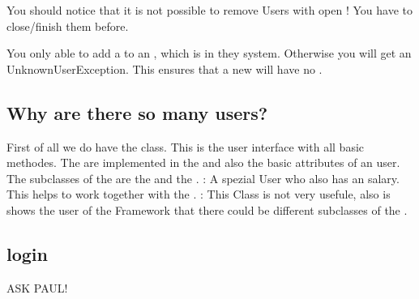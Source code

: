 You should notice that it is not possible to remove Users with open ! You have to close/finish them before.

You only able to add a  to an , which is in they system. Otherwise you will get an UnknownUserException.
This ensures that a new  will have no .

\subsection{Why are there so many users?}
First of all we do have the  class. This is the user interface with all basic methodes. The are implemented in the
 and also the basic attributes of an user.
The subclasses of the  are the  and the .
: A spezial User who also has an salary. This helps to work together with the .
: This Class is not very usefule, also is shows the user of the Framework that there could be different subclasses of the .


\subsection{login}

ASK PAUL!





